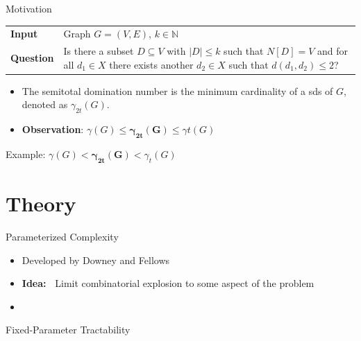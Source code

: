 \begin{frame}[c]{Motivation}
\begin{tcolorbox}[colback=TUMBlueLighter,title=\sdom]
    \begin{tabularx}{1.0\textwidth}{>{\hsize=0.30\hsize}X>{\hsize=0.8\hsize}X}
        \textbf{Input}    & Graph $G = (V, E)$, $k \in \mathbb{N}$\\
    \textbf{Question} & Is there a subset $D \subseteq V$ with $|D| \leq k$ such that ${N[D] = V}$ and for all $d_1 \in X$ there exists another $d_2 \in X$ such that ${d(d_1, d_2) \leq 2}$?
    \end{tabularx}
\end{tcolorbox}

\begin{itemize}
    \item The semitotal domination number is the minimum cardinality of a sds of $G$, denoted as $\gamma_{2t}(G)$.
    \item \textbf{Observation}: $\gamma(G) \leq  \mathbf{\gamma_{2t}(G)}  \leq \gamma{t}(G)$
\end{itemize}
\end{frame}

\begin{frame}[c]{Example: $\gamma(G) < \mathbf{\gamma_{2t}(G)} < \gamma_t(G)$}
\begin{figure}[!ht]
    \end{figure}
\end{frame}


\section{Theory}
\begin{frame}[c]{Parameterized Complexity}
    \begin{itemize}
        \item Developed by Downey and Fellows \\
        \item \textbf{Idea:~} Limit combinatorial explosion to some aspect of the problem\\
        \item 
    \end{itemize}

\end{frame}

\begin{frame}[c]{Fixed-Parameter Tractability}

\end{frame}

